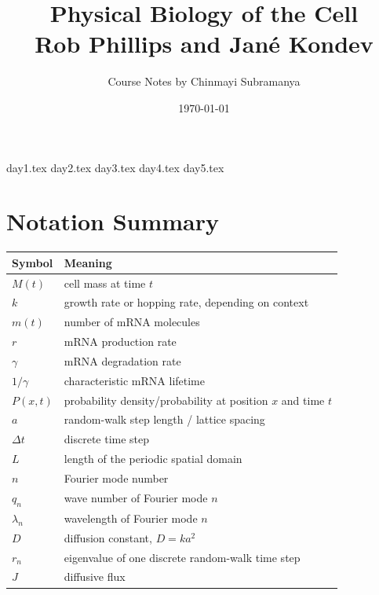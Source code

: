 \documentclass[11pt]{article}
\title{\huge{Physical Biology of the Cell} \\ \medskip \Large{Rob Phillips and Jan\'{e} Kondev}}
\author{Course Notes by Chinmayi Subramanya}
\date{\today}
\newcommand{\Dt}{\Delta t}
\begin{document}
\maketitle
\tableofcontents

{day1.tex}
{day2.tex}
{day3.tex}
{day4.tex}
{day5.tex}



\clearpage
\section*{Notation Summary}

\begin{center}
\begin{tabular}{ll}
\hline
Symbol & Meaning \\
\hline
$M(t)$ & cell mass at time $t$ \\
$k$ & growth rate or hopping rate, depending on context \\
$m(t)$ & number of mRNA molecules \\
$r$ & mRNA production rate \\
$\gamma$ & mRNA degradation rate \\
$1/\gamma$ & characteristic mRNA lifetime \\
$P(x,t)$ & probability density/probability at position $x$ and time $t$ \\
$a$ & random-walk step length / lattice spacing \\
$\Dt$ & discrete time step \\
$L$ & length of the periodic spatial domain \\
$n$ & Fourier mode number \\
$q_n$ & wave number of Fourier mode $n$ \\
$\lambda_n$ & wavelength of Fourier mode $n$ \\
$D$ & diffusion constant, $D=ka^2$ \\
$r_n$ & eigenvalue of one discrete random-walk time step \\
$J$ & diffusive flux \\
\hline
\end{tabular}
\end{center}


\end{document}
